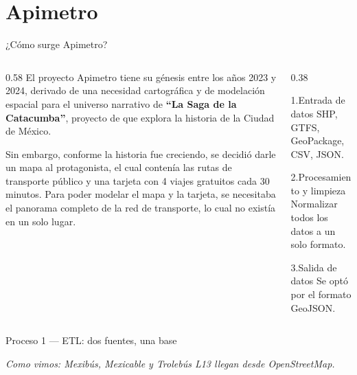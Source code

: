 \section{Apimetro}
\begin{frame}{¿Cómo surge Apimetro?}
  \begin{columns}[T]
    \begin{column}{0.58\textwidth}
      \small
      El proyecto Apimetro tiene su génesis entre los años 2023 y 2024,
      derivado de una necesidad cartográfica y de modelación espacial para el universo
      narrativo de \textbf{\enquote{La Saga de la Catacumba}}, proyecto de 
      que explora la historia de la Ciudad de México.

      \vspace{0.2cm}
      Sin embargo, conforme la historia fue creciendo, se decidió darle un mapa al
      protagonista, el cual contenía las rutas de transporte público y una tarjeta con 4
      viajes gratuitos cada 30 minutos. Para poder modelar el mapa y la tarjeta,
      se necesitaba el panorama completo de la red de transporte, lo cual no existía en un solo lugar.
    \end{column}
    \begin{column}{0.38\textwidth}
      \begin{exampleblock}{\footnotesize 1.\enspace Entrada de datos}
        \scriptsize SHP, GTFS, GeoPackage, CSV, JSON.
      \end{exampleblock}
      \begin{block}{\footnotesize 2.\enspace Procesamiento y limpieza}
        \scriptsize Normalizar todos los datos a un solo formato.
      \end{block}
      \begin{alertblock}{\footnotesize 3.\enspace Salida de datos}
        \scriptsize Se optó por el formato GeoJSON.
      \end{alertblock}
    \end{column}
  \end{columns}
\end{frame}

\begin{frame}{Proceso 1 — ETL: dos fuentes, una base}
  \centering
  \resizebox{0.92\linewidth}{!}{}\par

  \vspace{0.3cm}
  {\small\itshape\color{SotmVerde} Como vimos: Mexibús, Mexicable y Trolebús L13 llegan desde OpenStreetMap.}
\end{frame}

